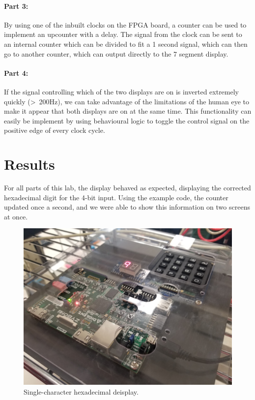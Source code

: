 \documentclass{article}
\begin{document}
\paragraph{Part 3:}

By using one of the inbuilt clocks on the FPGA board, a counter can be used to implement an
upcounter with a delay.
The signal from the clock can be sent to an internal counter which can
be divided to fit a 1 second signal, which can then go to another counter, which can output directly to
the 7 segment display.

\paragraph{Part 4:}

If the signal controlling which of the two displays are on is inverted 
extremely quickly (>~200Hz), we can take advantage of the limitations
of the human eye to make it appear that both displays are on at the same time.
This functionality can easily be implement by using behavioural logic to
toggle the control signal on the positive edge of every clock cycle.

\section{Results}

For all parts of this lab, the display behaved as expected,
displaying the corrected hexadecimal digit for the 4-bit input.
Using the example code, the counter updated once a second, and we were able
to show this information on two screens at once.


    \begin{figure}[H]
        \includegraphics[width=115mm]{display_single.jpg}
        \caption{Single-character hexadecimal deisplay.}
        \label{fig:display_single}
    \end{figure}
\end{document}
